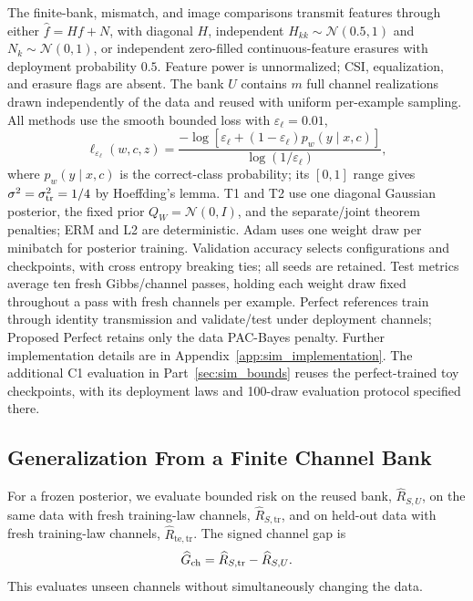 The finite-bank, mismatch, and image comparisons transmit features through
either $\widehat f=Hf+N$, with diagonal
$H$, independent $H_{kk}\sim\mathcal N(0.5,1)$ and $N_k\sim\mathcal N(0,1)$,
or independent zero-filled continuous-feature erasures with deployment probability
$0.5$. Feature power is unnormalized; CSI, equalization, and erasure flags
are absent. The bank $U$ contains $m$ full channel realizations drawn
independently of the data and reused with uniform per-example sampling.
All methods use the smooth bounded loss with $\varepsilon_\ell=0.01$,
\begin{equation}
\label{equ:sim_bounded_loss}
\ell_{\varepsilon_\ell}(w,c,z)=
\frac{-\log[\varepsilon_\ell+(1-\varepsilon_\ell)p_w(y\mid x,c)]}
{\log(1/\varepsilon_\ell)},
\end{equation}
where $p_w(y\mid x,c)$ is the correct-class probability; its $[0,1]$
range gives $\sigma^2=\sigma_{\rm tr}^2=1/4$ by Hoeffding's lemma.
T1 and T2 use one diagonal Gaussian posterior, the fixed prior
$Q_W=\mathcal N(0,I)$, and the separate/joint theorem penalties;
ERM and L2 are deterministic. Adam uses one weight draw per minibatch
for posterior training. Validation accuracy selects configurations and
checkpoints, with cross entropy breaking ties; all seeds are retained.
Test metrics average ten fresh Gibbs/channel passes, holding each
weight draw fixed throughout a pass with fresh channels per example.
Perfect references train through
identity transmission and validate/test under deployment channels;
Proposed Perfect retains only the data PAC-Bayes penalty. Further
implementation details are in Appendix~\ref{app:sim_implementation}.
The additional C1 evaluation in Part~\ref{sec:sim_bounds} reuses the
perfect-trained toy checkpoints, with its deployment laws and 100-draw
evaluation protocol specified there.

\subsection{Generalization From a Finite Channel Bank}
\label{sec:sim_channel_bank}
For a frozen posterior, we evaluate bounded risk on the reused bank,
$\widehat R_{S,U}$, on the same data with fresh training-law channels,
$\widehat R_{S,\mathrm{tr}}$, and on held-out data with fresh training-law
channels, $\widehat R_{\mathrm{te},\mathrm{tr}}$. The signed channel gap is
\begin{equation}
\label{equ:sim_channel_gap}
\widehat G_{\rm ch}=\widehat R_{S,\mathrm{tr}}-\widehat R_{S,U}.
\end{equation}
This evaluates unseen channels without simultaneously changing the data.

